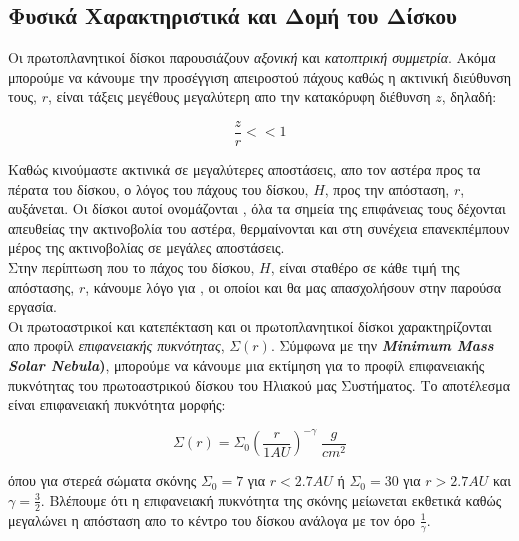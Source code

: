   \subsection{Φυσικά Χαρακτηριστικά και Δομή του Δίσκου}
  
Οι πρωτοπλανητικοί δίσκοι παρουσιάζουν {\it αξονική} και {\it κατοπτρική συμμετρία}. Ακόμα μπορούμε να κάνουμε την προσέγγιση απειροστού πάχους καθώς η ακτινική διεύθυνση τους, $r$, είναι τάξεις μεγέθους μεγαλύτερη απο την κατακόρυφη διέθυνση $z$, δηλαδή:
  
  \begin{equation}\label{eq:ZeroWidth}
    \frac{z}{r} << 1
  \end{equation}
  
   Καθώς κινούμαστε ακτινικά σε μεγαλύτερες αποστάσεις, απο τον αστέρα προς τα πέρατα του δίσκου, ο λόγος του πάχους του δίσκου, $H$, προς την απόσταση, $r$, αυξάνεται. Οι δίσκοι αυτοί ονομάζονται {}, όλα τα σημεία της επιφάνειας τους δέχονται απευθείας την ακτινοβολία του αστέρα, θερμαίνονται και στη συνέχεια επανεκπέμπουν μέρος της ακτινοβολίας σε μεγάλες αποστάσεις.\\
      
Στην περίπτωση που το πάχος του δίσκου, $H$, είναι σταθέρο σε κάθε τιμή της απόστασης, $r$, κάνουμε λόγο για {}, οι οποίοι και θα μας απασχολήσουν στην παρούσα εργασία.\\

Οι πρωτοαστρικοί και κατεπέκταση και οι πρωτοπλανητικοί δίσκοι χαρακτηρίζονται απο προφίλ {\it επιφανειακής πυκνότητας}, $\Sigma(r)$. Σύμφωνα με την\textbf{ {\it Minimum Mass Solar Nebula})}\cite[{\en Chap.~7, Sect.~7.2}]{tausigmaiotagammaacutealphanuetavarsigma2015pilambdaalphanuetatauiotakappaacutealpha}, μπορούμε να κάνουμε μια εκτίμηση για το προφίλ επιφανειακής πυκνότητας του πρωτοαστρικού δίσκου του Ηλιακού μας Συστήματος. Το αποτέλεσμα είναι επιφανειακή πυκνότητα μορφής:

 \begin{equation}\label{eq:SurfaceProfile}
 \Sigma(r) = \Sigma_0(\frac{r}{1AU})^{-\gamma} \; \frac{g}{cm^2}  
 \end{equation}

όπου για στερεά σώματα σκόνης $\Sigma_0=7$ για $ r < 2.7 AU$ ή $\Sigma_0=30$ για $ r > 2.7 AU$ και $\gamma=\frac{3}{2}$. Βλέπουμε ότι η επιφανειακή πυκνότητα της σκόνης μείωνεται εκθετικά καθώς μεγαλώνει η απόσταση απο το κέντρο του δίσκου ανάλογα με τον όρο $\frac{1}{\gamma}$. \\

